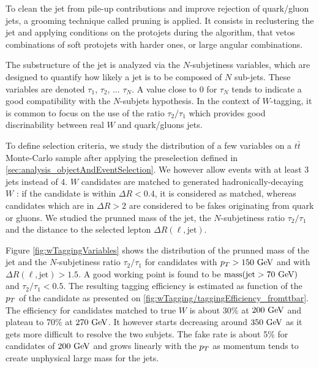             To clean the jet from pile-up contributions and improve rejection of
            quark/gluon jets, a grooming technique called pruning is applied. It
            consists in reclustering the jet and applying
            conditions on the protojets during the algorithm, that vetos combinations of
            soft protojets with harder ones, or large angular combinations.

            The substructure of the jet is analyzed via the $N$-subjetiness variables,
            which are designed to quantify how likely a jet is to be composed of $N$
            sub-jets.  These variables are denoted $\tau_1$,
            $\tau_2$, ... $\tau_N$. A value close to 0 for $\tau_N$ tends to indicate
            a good compatibility with the $N$-subjets hypothesis. In the context of
            $W$-tagging, it is common to focus on the use of the ratio $\tau_2/\tau_1$
            which provides good discrinability between real $W$ and quark/gluons jets.

            To define selection criteria, we study the distribution of a few variables
            on a $t\bar{t}$ Monte-Carlo sample after applying the preselection defined in
            \ref{sec:analysis_objectAndEventSelection}. We however allow events with at
            least 3 jets instead of 4. $W$ candidates are matched to generated
            hadronically-decaying $W$ : if the candidate is within $\Delta R < 0.4$, it
            is considered as matched, whereas candidates which are in $\Delta R > 2$ are
            considered to be fakes originating from quark or gluons. We studied the
            prunned mass of the jet, the $N$-subjetiness ratio $\tau_2 / \tau_1$ and the
            distance to the selected lepton $\Delta R (\ell,\text{jet})$.

            Figure \ref{fig:wTaggingVariables} shows the distribution of the prunned mass of
            the jet and the $N$-subjetiness ratio $\tau_2 / \tau_1$ for candidates with
            $p_T > 150~\text{GeV}$ and with $\Delta R(\ell,\text{jet}) > 1.5$. A good working point
            is found to be $\text{mass}(\text{jet} > 70~\text{GeV})$ and $\tau_2 / \tau_1 < 0.5$.
            The resulting tagging efficiency is estimated as function of the $p_T$ of the
            candidate as presented on \ref{fig:wTagging/taggingEfficiency_fromttbar}.
            The efficiency for candidates matched
            to true $W$ is about 30\% at $200~\text{GeV}$ and plateau to 70\% at $270~\text{GeV}$. It
            however starts decreasing around $350~\text{GeV}$ as it gets more difficult to resolve
            the two subjets. The fake rate is about 5\% for candidates of $200~\text{GeV}$ and
            grows linearly with the $p_T$ as momentum tends to create unphysical large
            mass for the jets.

